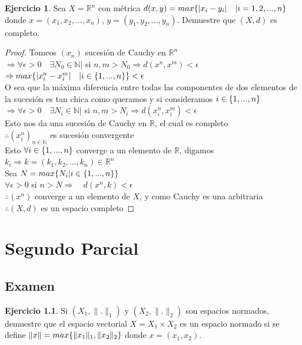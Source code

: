 \documentclass[11pt,a4paper,oneside]{report}
\theoremstyle{definition}
\newtheorem{ejercicio}[definicion]{Ejercicio}
\theoremstyle{plain}
\theoremstyle{remark}
\newcommand{\N}{\mathbb{N}}
\newcommand{\R}{\mathbb{R}}
\DeclarePairedDelimiter{\conj}{\{}{\}}
\begin{document}
\begin{ejercicio}
  Sea $X =\R^n$ con métrica $d(x,y)=max\conj{|x_i-y_i| \quad | i=1,2,...,n}$
  donde $x=(x_1,x_2,...,x_n)$, $y=(y_1,y_2,...,y_n)$. Demuestre que $(X,d)$
  es completo.
\end{ejercicio}

\begin{proof}
  Tomeos $(x_n)$ sucesión de Cauchy en $\R^n$\\
  $\Rightarrow \forall \epsilon>0 \quad \exists N_0\in \N |$ si $n,m>N_0\Rightarrow d(x^n,x^m)<\epsilon$\\
  $\Rightarrow max\conj{|x_i^n-x_i^m| \quad | i\in \conj{1,...,n}}<\epsilon$\\
  O sea que la máxima diferencia entre todas las componentes de dos elementos de la sucesión es tan chica como queramos
  y si consideramos $i\in \conj{1,...,n}$\\
  $\Rightarrow \forall \epsilon>0 \quad \exists N_i\in \N |$ si $n,m>N_i\Rightarrow d(x_i^n,x_i^m)<\epsilon$\\
  Esto nos da una sucesión de Cauchy en $\R$, el cual es completo\\
  $\therefore (x_i^{n})_{n \in \N}$ es sucesión convergente\\
  Esto $\forall i\in \conj{1,...,n}$ converge a un elemento de $\R$, digamos $k_i \Rightarrow k=(k_1,k_2,...,k_n)\in \R^n$\\
  Sea $N=max\conj{N_i | i\in \conj{1,...,n}}$\\
  $\forall \epsilon >0$ si $n>N \Rightarrow \quad d(x^n,k)<\epsilon$\\
  $\therefore (x^{n})$ converge a un elemento de $X$, y como Cauchy es una arbitraria\\ 
  $\therefore (X,d)$ es un espacio completo
\end{proof}

\chapter{Segundo Parcial}

\section{Examen}

\begin{ejercicio}
  Si $(X_1, \|.\|_1)$ y $(X_2, \|.\|_2)$ son espacios normados, demuestre que el 
  espacio vectorial $X=X_1\times X_2$ es un espacio normado si se define 
  $\|x\|=max\conj{\|x_1\|_1,\|x_2\|_2}$ donde $x=(x_1,x_2)$.
\end{ejercicio}
\end{document}
